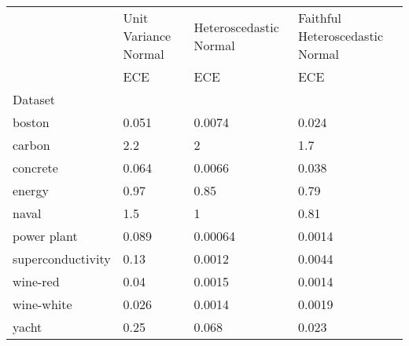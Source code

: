 \begin{tabular}{l|l|l|l}
\toprule
 & Unit Variance Normal & Heteroscedastic Normal & Faithful Heteroscedastic Normal \\
 & ECE & ECE & ECE \\
Dataset &  &  &  \\
\midrule
boston & 0.051 & 0.0074 & 0.024 \\
carbon & 2.2 & 2 & 1.7 \\
concrete & 0.064 & 0.0066 & 0.038 \\
energy & 0.97 & 0.85 & 0.79 \\
naval & 1.5 & 1 & 0.81 \\
power plant & 0.089 & 0.00064 & 0.0014 \\
superconductivity & 0.13 & 0.0012 & 0.0044 \\
wine-red & 0.04 & 0.0015 & 0.0014 \\
wine-white & 0.026 & 0.0014 & 0.0019 \\
yacht & 0.25 & 0.068 & 0.023 \\
\bottomrule
\end{tabular}
